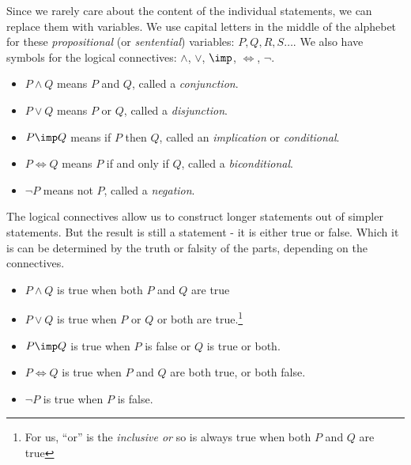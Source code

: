 Since we rarely care about the content of the individual statements, we can replace them with variables.  We use capital letters in the middle of the alphebet for these {\em propositional} (or {\em sentential}) variables: $P, Q, R, S\ldots$.  We also have symbols for the logical connectives: $\wedge$, $\vee$, $\imp$, $\iff$, $\neg$.

\begin{itemize}
 \item $P \wedge Q$ means  $P$ and $Q$, called a {\em conjunction}.
\item $P \vee Q$ means $P$ or $Q$, called a {\em disjunction}.
\item $P \imp Q$ means if $P$ then $Q$, called an {\em implication} or {\em conditional}.
\item $P \iff Q$ means $P$ if and only if $Q$, called a {\em biconditional}.
\item $\neg P$ means not $P$, called a {\em negation}.
\end{itemize}

The logical connectives allow us to construct longer statements out of simpler statements.  But the result is still a statement - it is either true or false.  Which it is can be determined by the truth or falsity of the parts, depending on the connectives.  

\begin{itemize}
 \item $P \wedge Q$ is true when both $P$ and $Q$ are true
\item $P \vee Q$ is true when $P$ or $Q$ or both are true.\footnote{For us, ``or'' is the {\em inclusive or} so is always true when both $P$ and $Q$ are true}
\item $P \imp Q$ is true when $P$ is false or $Q$ is true or both.
\item $P \iff Q$ is true when $P$ and $Q$ are both true, or both false.
\item $\neg P$ is true when $P$ is false. 
\end{itemize}


